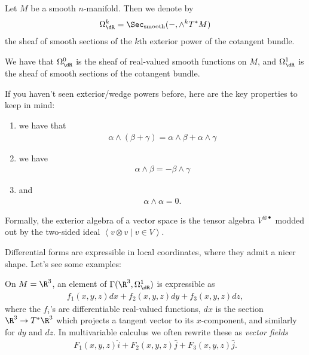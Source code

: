 \documentclass[11pt]{amsart}
\begin{document}
\begin{definition} Let $M$ be a smooth $n$-manifold. Then we denote by
\begin{align*}
    \Omega^k_{\dR} = \Sec_{\text{smooth}}(-,\wedge^k T^\ast M)
\end{align*}
the sheaf of smooth sections of the $k$th exterior power of the cotangent bundle.
\end{definition}

\begin{example} We have that $\Omega^0_\dR$ is the sheaf of real-valued smooth functions on $M$, and $\Omega^1_\dR$ is the sheaf of smooth sections of the cotangent bundle.
\end{example}

\begin{remark} If you haven't seen exterior/wedge powers before, here are the key properties to keep in mind:
\begin{enumerate}
    \item we have that
    \begin{align*}
        \alpha \wedge (\beta + \gamma) = \alpha \wedge \beta + \alpha \wedge \gamma
    \end{align*}
    \item we have
    \begin{align*}
        \alpha \wedge \beta = - \beta \wedge \gamma
    \end{align*}
    \item and
    \begin{align*}
        \alpha \wedge \alpha = 0.
    \end{align*}
\end{enumerate}
Formally, the exterior algebra of a vector space is the tensor algebra $V^{\otimes \bullet}$ modded out by the two-sided ideal $\left\langle v \otimes v \mid v\in V \right\rangle$.
\end{remark}




Differential forms are expressible in local coordinates, where they admit a nicer shape. Let's see some examples:

\begin{example}\label{exa:1-form-R3-vector-field} 
On $M = \R^3$, an element of $\Gamma(\R^3,\Omega^1_\dR)$ is expressible as
\begin{align*}
    f_1(x,y,z) dx + f_2(x,y,z) dy + f_3(x,y,z) dz,
\end{align*}
where the $f_i$'s are differentiable real-valued functions, $dx$ is the section $\R^3 \to T^\ast \R^3$ which projects a tangent vector to its $x$-component, and similarly for $dy$ and $dz$. In multivariable calculus we often rewrite these as \textit{vector fields}
\begin{align*}
    F_1(x,y,z) \hat{i} + F_2(x,y,z) \hat{j} + F_3(x,y,z) \hat{j}.
\end{align*}
\end{example}
\end{document}
